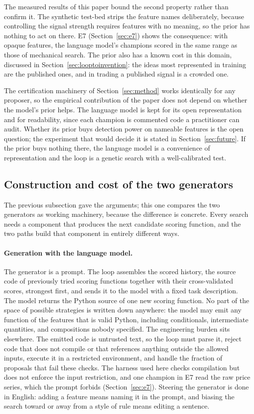 \documentclass[11pt]{article}
\begin{document}
The measured results of this paper bound the second property rather than confirm it. The synthetic
test-bed strips the feature names deliberately, because controlling the signal strength requires
features with no meaning, so the prior has nothing to act on there. E7 (Section~\ref{sec:e7}) shows
the consequence: with opaque features, the language model's champions scored in the same range as those
of mechanical search. The prior also has a known cost in this domain, discussed in
Section~\ref{sec:looptoinvention}: the ideas most represented in training are the published ones, and
in trading a published signal is a crowded one.

The certification machinery of Section~\ref{sec:method} works identically for any proposer, so the
empirical contribution of the paper does not depend on whether the model's prior helps. The language
model is kept for its open representation and for readability, since each champion is commented code a
practitioner can audit. Whether its prior buys detection power on nameable features is the open
question; the experiment that would decide it is stated in Section~\ref{sec:future}. If the prior buys
nothing there, the language model is a convenience of representation and the loop is a genetic search
with a well-calibrated test.

\subsection{Construction and cost of the two generators}
\label{sec:generation}

The previous subsection gave the arguments; this one compares the two generators as working machinery,
because the difference is concrete. Every search needs a component that produces the next candidate
scoring function, and the two paths build that component in entirely different ways.

\paragraph{Generation with the language model.} The generator is a prompt. The loop assembles the
scored history, the source code of previously tried scoring functions together with their
cross-validated scores, strongest first, and sends it to the model with a fixed task description. The
model returns the Python source of one new scoring function. No part of the space of possible
strategies is written down anywhere: the model may emit any function of the features that is valid
Python, including conditionals, intermediate quantities, and compositions nobody specified. The
engineering burden sits elsewhere. The emitted code is untrusted text, so the loop must parse it,
reject code that does not compile or that references anything outside the allowed inputs, execute it in
a restricted environment, and handle the fraction of proposals that fail these checks. The harness used
here checks compilation but does not enforce the input restriction, and one champion in E7 read the raw
price series, which the prompt forbids (Section~\ref{sec:e7}). Steering the
generator is done in English: adding a feature means naming it in the prompt, and biasing the search
toward or away from a style of rule means editing a sentence.
\end{document}
